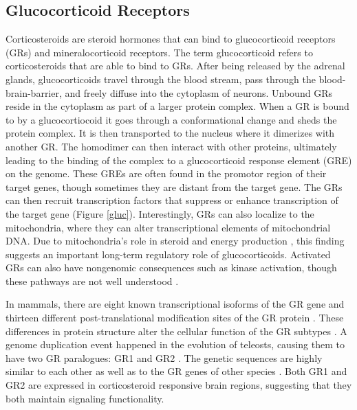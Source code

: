 \documentclass[12pt,twoside]{reedthesis}
\begin{document}
\subsection{Glucocorticoid Receptors}
Corticosteroids are steroid hormones that can bind to glucocorticoid receptors (GRs)
and mineralocorticoid receptors. The term glucocorticoid refers to
corticosteroids that are able to bind to GRs. After being
released by the adrenal glands, glucocorticoids travel through the blood stream,
pass through the blood-brain-barrier, and freely diffuse into the cytoplasm of
neurons. Unbound GRs reside in the cytoplasm as part of a larger protein
complex. When a GR is bound to by a glucocortiocoid it goes through a
conformational change and sheds the protein complex. It is then
transported to the nucleus where it dimerizes with another GR. The homodimer
can then interact with other proteins, ultimately leading to the binding of the
complex to a glucocorticoid response element (GRE) on the genome. These GREs are often
found in the promotor region of their target genes, though sometimes they are
distant from the target gene. The GRs can then recruit
transcription factors that suppress or enhance transcription of the target gene
\citep{2017Nrid, herman_limbic_2005} (Figure \ref{gluc}). Interestingly, GRs can also localize to the mitochondria,
where they can alter transcriptional elements of mitochondrial DNA. Due to
mitochondria's role in steroid and energy production \citep{lapp_stress_2019}, this finding
suggests an important long-term regulatory role of glucocorticoids. Activated GRs can also have nongenomic consequences such as kinase
activation, though these pathways are not well understood \citep{samarasinghe_nongenomic_2011}.

In mammals, there are eight known transcriptional isoforms of the GR gene \citep{saif_expression_2015} and
thirteen different post-translational modification sites of the GR protein \citep{oakley_biology_2013}. These differences in protein structure alter the
cellular function of the GR subtypes \citep{lu_selective_2007}. A genome duplication event happened in the evolution of teleosts, causing them
to have two GR paralogues: GR1 and GR2 \citep{Glasauer2014}. The genetic sequences are
highly similar to each other as well as to the GR genes of other species \citep{greenwood_multiple_2003}.
Both GR1 and GR2 are expressed in corticosteroid
responsive brain regions,
suggesting that they both maintain signaling functionality.
\end{document}
